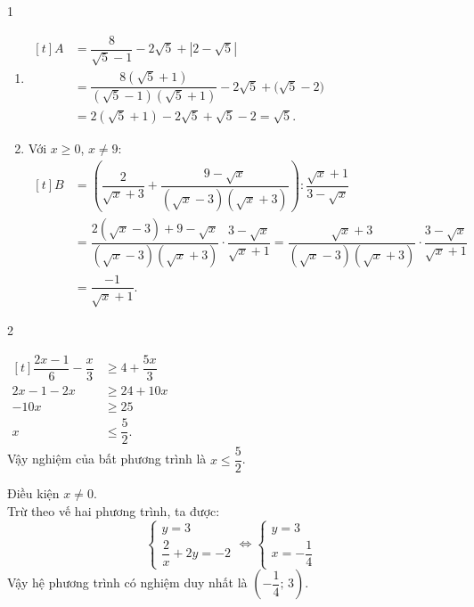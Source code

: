 \begin{Solbook}{1}
 \par \noindent  \begin {enumerate} \item \( \begin {aligned}[t] A &= \dfrac {8}{\sqrt {5}-1}-2\sqrt {5}+|2-\sqrt {5}|\\ &= \dfrac {8(\sqrt {5}+1)}{(\sqrt {5}-1)(\sqrt {5}+1)}-2\sqrt {5}+\big (\sqrt {5}-2\big )\\ &= 2(\sqrt {5}+1)-2\sqrt {5}+\sqrt {5}-2 = \sqrt {5}. \end {aligned} \) \item Với $x\ge 0$, $x\ne 9$:\\ \( \begin {aligned}[t] B&=\left (\dfrac {2}{\sqrt {x}+3}+\dfrac {9-\sqrt {x}}{(\sqrt {x}-3)(\sqrt {x}+3)}\right ):\dfrac {\sqrt {x}+1}{3-\sqrt {x}}\\ &=\dfrac {2(\sqrt {x}-3)+9-\sqrt {x}}{(\sqrt {x}-3)(\sqrt {x}+3)}\cdot \dfrac {3-\sqrt {x}}{\sqrt {x}+1} =\dfrac {\sqrt {x}+3}{(\sqrt {x}-3)(\sqrt {x}+3)}\cdot \dfrac {3-\sqrt {x}}{\sqrt {x}+1}\\ &=\dfrac {-1}{\sqrt {x}+1}. \end {aligned} \) \end {enumerate}  \hfill \qedEX 
\end{Solbook}
\begin{Solbook}{2}
 \par \noindent  \begin {listEX}[2] \item \( \begin {aligned}[t] \dfrac {2x-1}{6}-\dfrac {x}{3}&\ge 4+\dfrac {5x}{3}\\ 2x-1-2x&\ge 24+10x\\ -10x&\ge 25\\ x&\le \dfrac {5}{2}. \end {aligned} \)\\ Vậy nghiệm của bất phương trình là $x\le \dfrac {5}{2}$. \item Điều kiện $x\ne 0$. \\Trừ theo vế hai phương trình, ta được: \[\begin {cases} y=3\\ \dfrac {2}{x}+2y=-2 \end {cases} \Leftrightarrow \begin {cases} y=3\\ x=-\dfrac {1}{4} \end {cases}\] Vậy hệ phương trình có nghiệm duy nhất là $\left (-\dfrac {1}{4};\,3\right )$. \end {listEX} \hfill \qedEX 
\end{Solbook}
